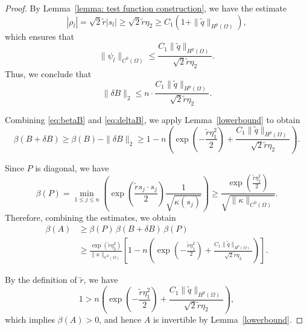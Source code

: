 \documentclass[12pt]{amsart}
\begin{document}
\begin{proof}
By Lemma~\ref{lemma: test function construction}, we have the estimate
\[
|\rho_l| = \sqrt{2} \tilde{r} |s_l| \geq \sqrt{2} \tilde{r} \eta_2 
    \geq C_1\left(1 + \|\tilde{q}\|_{H^p(\Omega)} \right),
\]
which ensures that
\[
\|\psi_l\|_{C^0(\Omega)} \leq \frac{C_1 \|\tilde{q}\|_{H^p(\Omega)}}{\sqrt{2} \tilde{r} \eta_2}.
\]
Thus, we conclude that
\begin{equation}\label{eq:deltaB}
    \|\delta B\|_2 \leq n \cdot \frac{C_1 \|\tilde{q}\|_{H^p(\Omega)}}{\sqrt{2} \tilde{r} \eta_2}.
\end{equation}

Combining \eqref{eq:betaB} and \eqref{eq:deltaB}, we apply Lemma~\ref{lowerbound} to obtain
\begin{equation*}
    \beta(B + \delta B) \geq \beta(B) - \|\delta B\|_2 
    \geq 1 - n\left( \exp\left(-\frac{\tilde{r} \eta_1^2}{2} \right) + \frac{C_1 \|\tilde{q}\|_{H^p(\Omega)}}{\sqrt{2} \tilde{r} \eta_2} \right).
\end{equation*}

Since $P$ is diagonal, we have
\[
\beta(P) = \min_{1 \leq j \leq n} 
\left( \exp\left(\frac{\tilde{r} s_j \cdot s_j}{2} \right) 
\frac{1}{\sqrt{\kappa(s_j)}} \right)
\geq \frac{\exp\left(\frac{\tilde{r} \eta_2^2}{2} \right)}{\sqrt{ \|\kappa\|_{C^0(\Omega)} }}.
\]
Therefore, combining the estimates, we obtain
\begin{align*}
    \beta(A) 
    &\geq \beta(P)\, \beta(B + \delta B)\, \beta(P) \\
    &\geq \frac{\exp(\tilde{r} \eta_2^2)}{\|\kappa\|_{C^0(\Omega)}} 
    \left[ 1 - n \left( \exp\left(-\frac{\tilde{r} \eta_1^2}{2} \right) + \frac{C_1 \|\tilde{q}\|_{H^p(\Omega)}}{\sqrt{2} \tilde{r} \eta_2} \right) \right].
\end{align*}

By the definition of $\tilde{r}$, we have
\[
1 > n \left( \exp\left(-\frac{\tilde{r} \eta_1^2}{2} \right) + \frac{C_1 \|\tilde{q}\|_{H^p(\Omega)}}{\sqrt{2} \tilde{r} \eta_2} \right),
\]
which implies $\beta(A) > 0$, and hence $A$ is invertible by Lemma~\ref{lowerbound}.


\end{proof}
\end{document}
